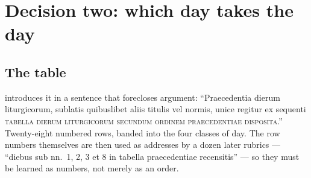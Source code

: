 \section{Decision two: which day takes the day}

\subsection{The table}

 introduces it in a sentence that forecloses argument: ``Praecedentia
dierum liturgicorum, sublatis quibuslibet aliis titulis vel normis, unice
regitur ex sequenti \textsc{tabella dierum liturgicorum secundum ordinem
praecedentiae disposita}.'' Twenty-eight numbered rows, banded into the four
classes of day. The row numbers themselves are then used as addresses by a
dozen later rubrics --- ``diebus sub nn.~1, 2, 3 et 8 in tabella praecedentiae
recensitis'' --- so they must be learned as numbers, not merely as an order.

